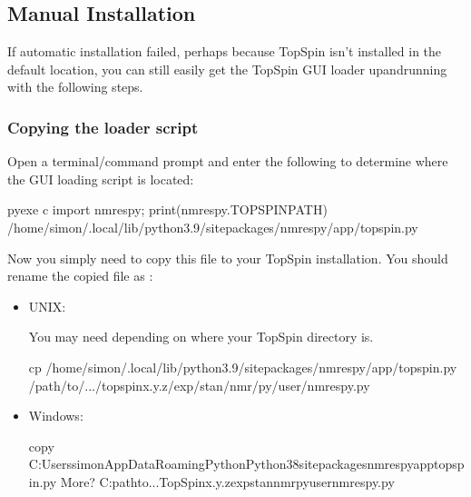 \documentclass[letterpaper,10pt,english]{sphinxmanual}
\begin{document}
\subsection{Manual Installation}
\label{\detokenize{gui/topspin_install:manual-installation}}
\sphinxAtStartPar
If automatic installation failed, perhaps because TopSpin isn’t installed in
the default location, you can still easily get the TopSpin GUI loader
up\sphinxhyphen{}and\sphinxhyphen{}running with the following steps.


\subsubsection{Copying the loader script}
\label{\detokenize{gui/topspin_install:copying-the-loader-script}}
\sphinxAtStartPar
Open a terminal/command prompt and enter the following to
determine where the GUI loading script is located:

\begin{sphinxVerbatim}[commandchars=\\\{\}]
\PYGZdl{} \PYGZlt{}pyexe\PYGZgt{} \PYGZhy{}c \PYGZdq{}import nmrespy; print(nmrespy.TOPSPINPATH)\PYGZdq{}
/home/simon/.local/lib/python3.9/site\PYGZhy{}packages/nmrespy/app/\PYGZus{}topspin.py
\end{sphinxVerbatim}

\sphinxAtStartPar
Now you simply need to copy this file to your TopSpin installation. You should
rename the copied file as :
\begin{itemize}
\item {} 
\sphinxAtStartPar
UNIX:

\sphinxAtStartPar
You may need  depending on where your TopSpin directory is.

\begin{sphinxVerbatim}[commandchars=\\\{\}]
\PYGZdl{} cp /home/simon/.local/lib/python3.9/site\PYGZhy{}packages/nmrespy/app/\PYGZus{}topspin.py \PYGZbs{}
\PYGZgt{} /path/to/.../topspinx.y.z/exp/stan/nmr/py/user/nmrespy.py
\end{sphinxVerbatim}

\item {} 
\sphinxAtStartPar
Windows:

\begin{sphinxVerbatim}[commandchars=\\\{\}]
\PYGZgt{} copy C:\PYGZbs{}Users\PYGZbs{}simon\PYGZbs{}AppData\PYGZbs{}Roaming\PYGZbs{}Python\PYGZbs{}Python38\PYGZbs{}site\PYGZhy{}packages\PYGZbs{}nmrespy\PYGZbs{}app\PYGZbs{}\PYGZus{}topspin.py \PYGZca{}
More? C:\PYGZbs{}path\PYGZbs{}to\PYGZbs{}...\PYGZbs{}TopSpinx.y.z\PYGZbs{}exp\PYGZbs{}stan\PYGZbs{}nmr\PYGZbs{}py\PYGZbs{}user\PYGZbs{}nmrespy.py
\end{sphinxVerbatim}

\end{itemize}
\end{document}

